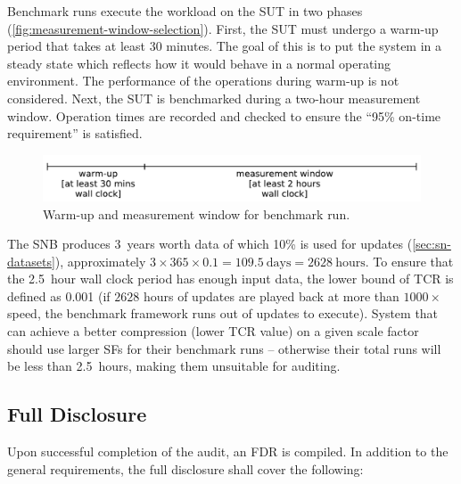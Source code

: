 Benchmark runs execute the workload on the SUT in two phases (\autoref{fig:measurement-window-selection}).
First, the SUT must undergo a warm-up period that takes at least 30 minutes. The goal of this is to put the system in a steady state which reflects how it would behave in a normal operating environment. The performance of the operations during warm-up is not considered.
Next, the SUT is benchmarked during a two-hour measurement window. Operation times are recorded and checked to ensure the ``95\% on-time requirement'' is satisfied.

\begin{figure}[h]
    \centering
    \includegraphics[width=.7\linewidth]{figures/measurement-window-selection}
    \caption{Warm-up and measurement window for benchmark run.}
    \label{fig:measurement-window-selection}
\end{figure}

The SNB \datagen produces 3~years worth data of which 10\% is used for updates (\autoref{sec:sn-datasets}), \ie approximately $3 \times 365 \times 0.1 = 109.5~\text{days} = 2628~\text{hours}$.
To ensure that the 2.5~hour wall clock period has enough input data, the lower bound of TCR is defined as 0.001 (if $2628$ hours of updates are played back at more than $1000\times$ speed, the benchmark framework runs out of updates to execute). System that can achieve a better compression (\ie lower TCR value) on a given scale factor should use larger SFs for their benchmark runs -- otherwise their total runs will be less than 2.5~hours, making them unsuitable for auditing.


\subsection{Full Disclosure}
Upon successful completion of the audit, an FDR is compiled. In addition to the general requirements, the full disclosure shall cover the following:


